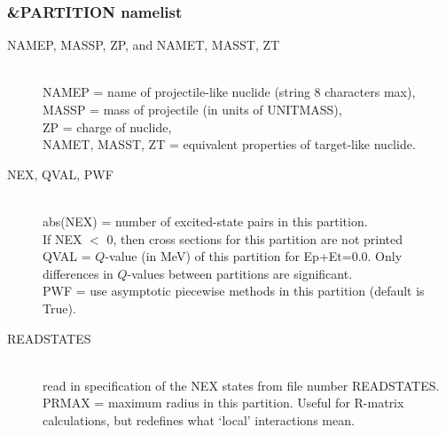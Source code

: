 \documentclass[11pt]{article}
\begin{document}
\subsubsection{\&PARTITION namelist}
%
\begin{description}
\item[NAMEP,  MASSP,  ZP,  and NAMET,   MASST,    ZT] ~\\
NAMEP = name of projectile-like nuclide (string 8 characters max),  \\
MASSP = mass of projectile (in units of UNITMASS), \\
ZP = charge of nuclide, \\
NAMET, MASST, ZT = equivalent properties of target-like nuclide.

\item[NEX,  QVAL, PWF] ~\\
abs(NEX) = number of excited-state pairs in this partition. \\
If NEX $<$ 0, then cross sections for this partition are not printed\\
QVAL = $Q$-value (in MeV) of this partition for Ep+Et=0.0. Only differences in $Q$-values between partitions are significant.\\
PWF = use asymptotic piecewise methods in this partition (default is True).

\item[READSTATES] ~ \\ %
 read in specification of the NEX states from file number READSTATES. \\
PRMAX = maximum radius in this partition. Useful for R-matrix calculations, but redefines what `local' interactions mean.\\

%


\end{description}
\end{document}
